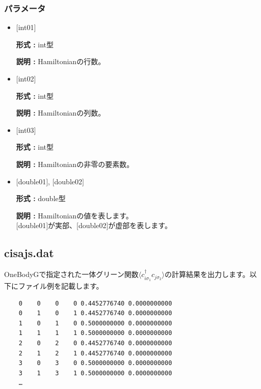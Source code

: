 \subsubsection{パラメータ}
 \begin{itemize}

  \item  $[$int01$]$

 {\bf 形式 :} int型

{\bf 説明 :} Hamiltonianの行数。
 
  \item  $[$int02$]$

 {\bf 形式 :} int型 

{\bf 説明 :} Hamiltonianの列数。

  \item  $[$int03$]$

 {\bf 形式 :} int型 

{\bf 説明 :} Hamiltonianの非零の要素数。

  \item  $[$double01$]$, $[$double02$]$

 {\bf 形式 :} double型 

{\bf 説明 :} Hamiltonianの値を表します。\\
$[$double01$]$が実部、$[$double02$]$が虚部を表します。

\end{itemize}

\newpage
\subsection{{cisajs.dat}}
\label{Subsec:cgcisajs}
OneBodyGで指定された一体グリーン関数$\langle c_{i\sigma_1}^{\dagger}c_{j\sigma_2}\rangle$の計算結果を出力します。以下にファイル例を記載します。

\begin{minipage}{12.5cm}
\begin{screen}
\begin{verbatim}
    0    0    0    0 0.4452776740 0.0000000000
    0    1    0    1 0.4452776740 0.0000000000
    1    0    1    0 0.5000000000 0.0000000000
    1    1    1    1 0.5000000000 0.0000000000
    2    0    2    0 0.4452776740 0.0000000000
    2    1    2    1 0.4452776740 0.0000000000
    3    0    3    0 0.5000000000 0.0000000000
    3    1    3    1 0.5000000000 0.0000000000
    …
\end{verbatim}
\end{screen}
\end{minipage}

